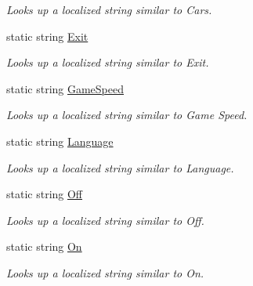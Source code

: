\begin{DoxyCompactItemize}
\begin{DoxyCompactList}\small\item\em Looks up a localized string similar to Cars. \item\end{DoxyCompactList}\item 
static string \hyperlink{classCityMania_1_1Resources_a6d9e6171c2c0a42a4c301065e5ef83bc}{Exit}
\begin{DoxyCompactList}\small\item\em Looks up a localized string similar to Exit. \item\end{DoxyCompactList}\item 
static string \hyperlink{classCityMania_1_1Resources_aafcdfc87a91a665407051a77ce79aa3e}{GameSpeed}
\begin{DoxyCompactList}\small\item\em Looks up a localized string similar to Game Speed. \item\end{DoxyCompactList}\item 
static string \hyperlink{classCityMania_1_1Resources_ab02fb301243f7303a0ff3453e4a39260}{Language}
\begin{DoxyCompactList}\small\item\em Looks up a localized string similar to Language. \item\end{DoxyCompactList}\item 
static string \hyperlink{classCityMania_1_1Resources_a8e9eac5a0223fd7aeac5a56c11e52f46}{Off}
\begin{DoxyCompactList}\small\item\em Looks up a localized string similar to Off. \item\end{DoxyCompactList}\item 
static string \hyperlink{classCityMania_1_1Resources_aa1871c95d9c56646b4ac945356bc04d0}{On}
\begin{DoxyCompactList}\small\item\em Looks up a localized string similar to On. \item\end{DoxyCompactList}\item 

\end{DoxyCompactItemize}
